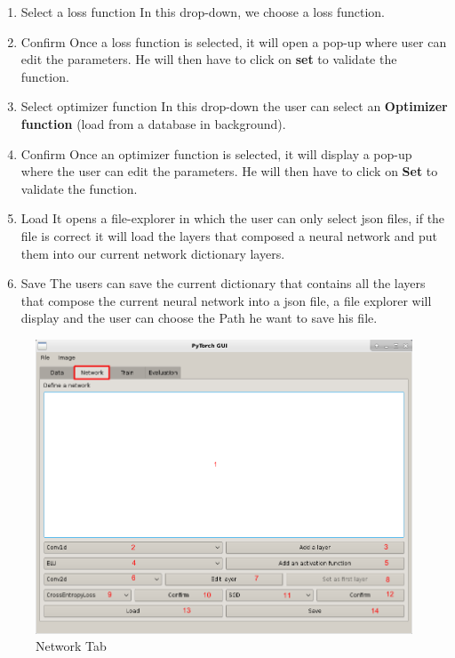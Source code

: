 \begin{enumerate}
    \item Select a loss function \newline
        In this drop-down, we choose a loss function.
    \item Confirm \newline
    Once a loss function is selected, it will open a pop-up where user can edit the parameters.
    He will then have to click on \textbf{set} to validate the function.
    \item Select optimizer function \newline
    In this drop-down the user can select an \textbf{Optimizer function} (load from a database in background). 
    \item Confirm \newline
    Once an optimizer function is selected, it will display a pop-up where the user can edit the parameters. 
    He will then have to click on \textbf{Set} to validate the function.
    \item Load \newline
    It opens a file-explorer in which the user can only select json files, if the file is correct it will load the layers that composed a neural network and put them into our current network dictionary layers.
    
    \item Save \newline
    The users can save the current dictionary that contains all the layers that compose the current neural network into a json file, a file explorer will display and the user can choose the Path he want to save his file.
\end{enumerate}

\begin{figure}[h!]
    \centering 
    \includegraphics[scale=0.4]{figures/app_screen_shoots/Network_tab.png}
    \caption{Network Tab}
\end{figure}


